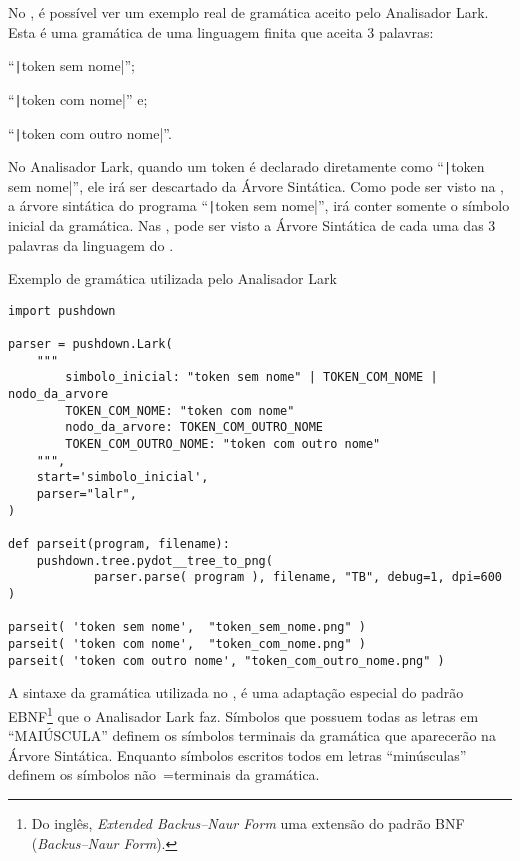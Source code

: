 No ,
é possível ver um exemplo real de gramática aceito pelo Analisador Lark.
Esta é uma gramática de uma linguagem finita que aceita 3 palavras:
\begin{inparaenum}[1)]
\item ``\texttt|token sem nome|'';
\item ``\texttt|token com nome|'' e;
\item ``\texttt|token com outro nome|''.
\end{inparaenum}%
No Analisador Lark,
quando um token é declarado diretamente como ``\texttt|token sem nome|'',
ele irá ser descartado da Árvore Sintática.
Como pode ser visto na ,
a árvore sintática do programa ``\texttt|token sem nome|'',
irá conter somente o símbolo inicial da gramática.
Nas ,
pode ser visto a Árvore Sintática de cada uma das 3 palavras da linguagem do .
\begin{code}
\caption{Exemplo de gramática utilizada pelo Analisador Lark}
\label{code:ExemploDeGramaticaLark}
\begin{verbatim}
import pushdown

parser = pushdown.Lark(
    """
        simbolo_inicial: "token sem nome" | TOKEN_COM_NOME | nodo_da_arvore
        TOKEN_COM_NOME: "token com nome"
        nodo_da_arvore: TOKEN_COM_OUTRO_NOME
        TOKEN_COM_OUTRO_NOME: "token com outro nome"
    """,
    start='simbolo_inicial',
    parser="lalr",
)

def parseit(program, filename):
    pushdown.tree.pydot__tree_to_png(
            parser.parse( program ), filename, "TB", debug=1, dpi=600 )

parseit( 'token sem nome',  "token_sem_nome.png" )
parseit( 'token com nome',  "token_com_nome.png" )
parseit( 'token com outro nome', "token_com_outro_nome.png" )
\end{verbatim}
\end{code}

A sintaxe da gramática utilizada no ,
é uma adaptação especial do padrão EBNF\footnote{
Do inglês,
\textit{Extended Backus–Naur Form} uma extensão do padrão BNF (\textit{Backus–Naur Form}).
}
\cite{teachingEbnf,antlrBookTerrentParr,larkGrammarReference,larkStyleCheat} que o Analisador Lark faz.
Símbolos que possuem todas as letras em ``MAIÚSCULA'' definem os símbolos terminais da gramática que aparecerão na Árvore Sintática.
Enquanto símbolos escritos todos em letras ``minúsculas'' definem os símbolos não~=terminais da gramática.

